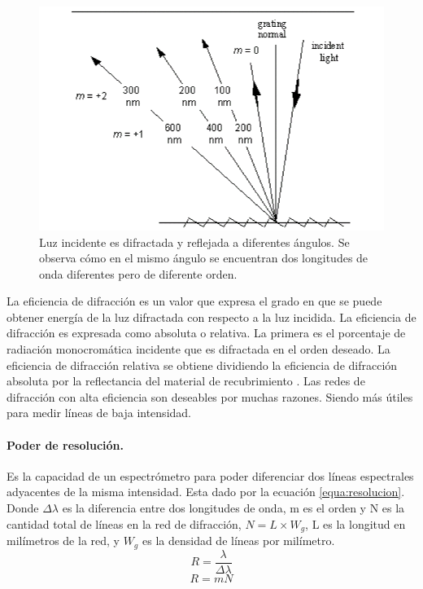 \begin{figure}[h]
	\centering
	\includegraphics[width=0.7\linewidth]{Imagenes/2/ordenes}
	\caption[Difracción de la luz se aprecia el orden de difracción de diferentes longitudes de onda.]{Luz incidente es difractada y reflejada a diferentes ángulos. Se observa cómo en el mismo ángulo se encuentran dos longitudes de onda diferentes pero de diferente orden. \cite{Palmer2005}}
	\label{fig:ordenes}
\end{figure}


La eficiencia de difracción es un valor que expresa el grado en que se puede obtener energía de la luz difractada con respecto a la luz incidida.
La eficiencia de difracción es expresada como absoluta o relativa. La primera es el porcentaje de radiación monocromática incidente que es difractada en el orden deseado. La eficiencia de difracción relativa se obtiene dividiendo la eficiencia de difracción absoluta por la reflectancia del material de recubrimiento \cite{Shimadzu}.
Las redes de difracción con alta eficiencia son deseables por muchas razones. Siendo más útiles para medir líneas de baja intensidad. \cite{Palmer2005}
\paragraph{Poder de resolución.} 
Es la capacidad de un espectrómetro para poder diferenciar dos líneas espectrales adyacentes de la misma intensidad. Esta dado por la ecuación \ref{equa:resolucion}. Donde $\Delta\lambda$ es la diferencia entre dos longitudes de onda, m es el orden y N es la cantidad total de líneas en la red de difracción, $N= L\times W_g$, L es la longitud en milímetros de la red, y $W_g$ es la densidad de líneas por milímetro.
\begin{equation}
	R = \frac{\lambda}{\Delta \lambda}
	\label{equa:resolucion}
\end{equation}
\begin{equation}
	R = mN
	\label{equa:resolucion2}
\end{equation}

